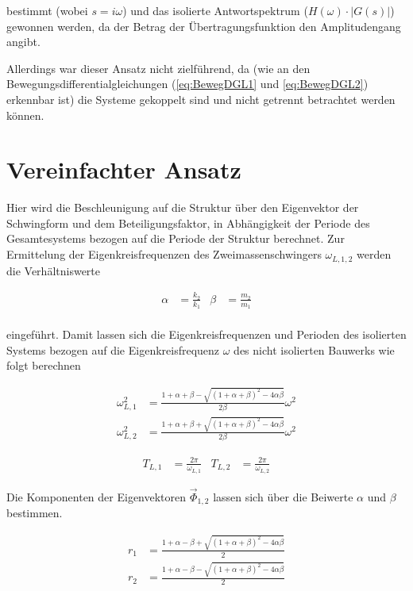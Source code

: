 bestimmt (wobei $s = i \omega$) und das isolierte Antwortspektrum ($H(\omega) \cdot |G(s)|$) gewonnen werden, da der Betrag der Übertragungsfunktion den Amplitudengang angibt.

Allerdings war dieser Ansatz nicht zielführend, da (wie an den Bewegungsdifferentialgleichungen (\cref{eq:BewegDGL1} und \cref{eq:BewegDGL2}) erkennbar ist) die Systeme gekoppelt sind und nicht getrennt betrachtet werden können.

\section{Vereinfachter Ansatz}
\label{sec:ansatzvereinfacht}

Hier wird die Beschleunigung auf die Struktur über den Eigenvektor der Schwingform und dem Beteiligungsfaktor, in Abhängigkeit der Periode des Gesamtesystems bezogen auf die Periode der Struktur berechnet.
Zur Ermittelung der Eigenkreisfrequenzen des Zweimassenschwingers $\omega_{L,1,2}$ werden die Verhältniswerte

\begin{align}
\alpha &= \frac{k_2}{k_1} & \beta  &= \frac{m_2}{m_1} \\
\end{align}

eingeführt. Damit lassen sich die Eigenkreisfrequenzen und Perioden des isolierten Systems bezogen auf die Eigenkreisfrequenz $\omega$ des nicht isolierten Bauwerks wie folgt berechnen \cite{Pocanschi} \cite{Isemann}

\begin{align}
\omega_{L,1}^2 &= \frac{1 + \alpha + \beta - \sqrt{(1 + \alpha + \beta)^2 - 4 \alpha \beta}}{2 \beta} \omega^2\\
\omega_{L,2}^2 &= \frac{1 + \alpha + \beta + \sqrt{(1 + \alpha + \beta)^2 - 4 \alpha \beta}}{2 \beta} \omega^2
\end{align}

\begin{align}
T_{L,1} &= \frac{2 \pi}{\omega_{L,1}} & T_{L,2} &= \frac{2 \pi}{\omega_{L,2}}
\end{align}

Die Komponenten der Eigenvektoren $\vec{\Phi}_{1,2}$ lassen sich über die Beiwerte $\alpha$ und $\beta$ bestimmen.

\begin{align}
r_1 &= \frac{1 + \alpha - \beta + \sqrt{(1 + \alpha + \beta)^2 - 4 \alpha \beta}}{2}\\
r_2 &= \frac{1 + \alpha - \beta - \sqrt{(1 + \alpha + \beta)^2 - 4 \alpha \beta}}{2}
\end{align}

